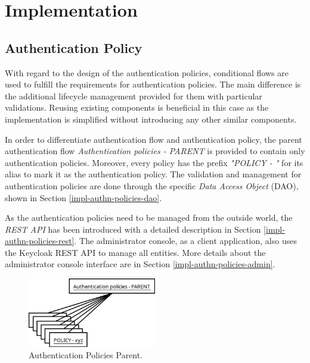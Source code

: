 \chapter{Implementation} \label{implementation}

\section{Authentication Policy}
With regard to the design of the authentication policies, conditional flows are used to fulfill the requirements for authentication policies.
The main difference is the additional lifecycle management provided for them with particular validations.
Reusing existing components is beneficial in this case as the implementation is simplified without introducing any other similar components.

In order to differentiate authentication flow and authentication policy, the parent authentication flow \textit{Authentication policies - PARENT} is provided to contain only authentication policies.
Moreover, every policy has the prefix \textit{"POLICY - "} for its alias to mark it as the authentication policy.
The validation and management for authentication policies are done through the specific \textit{Data Access Object} (DAO), shown in Section \ref{impl-authn-policies-dao}. 

As the authentication policies need to be managed from the outside world, the \textit{REST API} has been introduced with a detailed description in Section \ref{impl-authn-policies-rest}.
The administrator console, as a client application, also uses the Keycloak REST API to manage all entities.
More details about the administrator console interface are in Section \ref{impl-authn-policies-admin}.

\begin{figure}[htbp]
  \centering
  \includegraphics[width=0.5\textwidth]{img/sections/6-implementation/auth-policies-parent.png}
  \caption{Authentication Policies Parent.}
  \label{fig:impl-authn-policies-parent}
\end{figure}

\newpage

